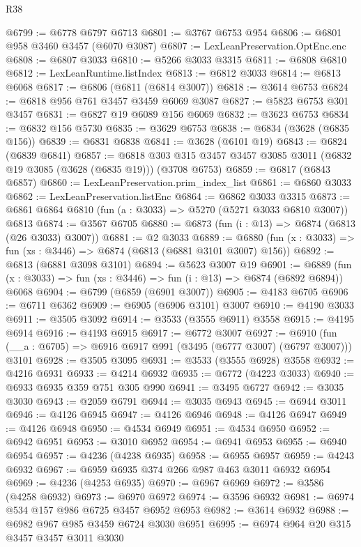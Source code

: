 \begin{lexlean}{R38}
\begin{coremodule}
@6799 := @6778 @6797 @6713
@6801 := @3767 @6753 @954
@6806 := @6801 @958 @3460 @3457 (@6070 @3087)
@6807 := LexLeanPreservation.OptEnc.enc
@6808 := @6807 @3033
@6810 := @5266 @3033 @3315
@6811 := @6808 @6810
@6812 := LexLeanRuntime.listIndex
@6813 := @6812 @3033
@6814 := @6813 @6068
@6817 := @6806 (@6811 (@6814 @3007))
@6818 := @3614 @6753
@6824 := @6818 @956 @761 @3457 @3459 @6069 @3087
@6827 := @5823 @6753 @301 @3457
@6831 := @6827 @19 @6089 @156 @6069
@6832 := @3623 @6753
@6834 := @6832 @156 @5730
@6835 := @3629 @6753
@6838 := @6834 (@3628 (@6835 @156))
@6839 := @6831 @6838
@6841 := @3628 (@6101 @19)
@6843 := @6824 (@6839 @6841)
@6857 := @6818 @303 @315 @3457 @3457 @3085 @3011 (@6832 @19 @3085 (@3628 (@6835 @19))) (@3708 @6753)
@6859 := @6817 (@6843 @6857)
@6860 := LexLeanPreservation.prim_index_list
@6861 := @6860 @3033
@6862 := LexLeanPreservation.listEnc
@6864 := @6862 @3033 @3315
@6873 := @6861 @6864 @6810 (fun (a : @3033) => @5270 (@5271 @3033 @6810 @3007)) @6813
@6874 := @3567 @6705
@6880 := @6873 (fun (i : @13) => @6874 (@6813 (@26 @3033) @3007))
@6881 := @2 @3033
@6889 := @6880 (fun (x : @3033) => fun (xs : @3446) => @6874 (@6813 (@6881 @3101 @3007) @156))
@6892 := @6813 (@6881 @3098 @3101)
@6894 := @5623 @3007 @19
@6901 := @6889 (fun (x : @3033) => fun (xs : @3446) => fun (i : @13) => @6874 (@6892 @6894)) @6068
@6904 := @6799 (@6859 (@6901 @3007))
@6905 := @4183 @6705
@6906 := @6711 @6362
@6909 := @6905 (@6906 @3101) @3007
@6910 := @4190 @3033
@6911 := @3505 @3092
@6914 := @3533 (@3555 @6911) @3558
@6915 := @4195 @6914
@6916 := @4193 @6915
@6917 := @6772 @3007
@6927 := @6910 (fun (__a : @6705) => @6916 @6917 @991 (@3495 (@6777 @3007) (@6797 @3007))) @3101
@6928 := @3505 @3095
@6931 := @3533 (@3555 @6928) @3558
@6932 := @4216 @6931
@6933 := @4214 @6932
@6935 := @6772 (@4223 @3033)
@6940 := @6933 @6935 @359 @751 @305 @990
@6941 := @3495 @6727
@6942 := @3035 @3030
@6943 := @2059 @6791
@6944 := @3035 @6943
@6945 := @6944 @3011
@6946 := @4126 @6945
@6947 := @4126 @6946
@6948 := @4126 @6947
@6949 := @4126 @6948
@6950 := @4534 @6949
@6951 := @4534 @6950
@6952 := @6942 @6951
@6953 := @3010 @6952
@6954 := @6941 @6953
@6955 := @6940 @6954
@6957 := @4236 (@4238 @6935)
@6958 := @6955 @6957
@6959 := @4243 @6932
@6967 := @6959 @6935 @374 @266 @987 @463 @3011 @6932 @6954
@6969 := @4236 (@4253 @6935)
@6970 := @6967 @6969
@6972 := @3586 (@4258 @6932)
@6973 := @6970 @6972
@6974 := @3596 @6932
@6981 := @6974 @534 @157 @986 @6725 @3457 @6952 @6953
@6982 := @3614 @6932
@6988 := @6982 @967 @985 @3459 @6724 @3030 @6951
@6995 := @6974 @964 @20 @315 @3457 @3457 @3011 @3030

\end{coremodule}
\end{lexlean}
